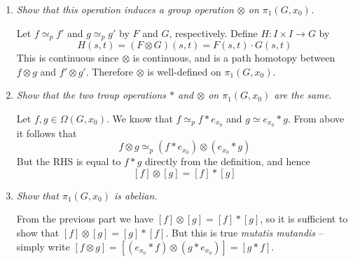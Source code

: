 \documentclass[10pt]{article}
\begin{document}
\begin{enumerate}
\begin{enumerate}
\item \emph{Show that this operation induces a group operation $\otimes$ on $\pi_1(G,x_0)$.}

Let $f \simeq_p f'$ and $g \simeq_p g'$ by $F$ and $G$, respectively.  Define $H: I \times I \rightarrow G$ by $$H(s,t) = (F \otimes G)(s,t) = F(s,t) \cdot G(s,t)$$  This is continuous since $\otimes$ is continuous, and is a path homotopy between $f \otimes g$ and $f' \otimes g'$.  Therefore $\otimes$ is well-defined on $\pi_1(G,x_0)$.

\item \emph{Show that the two troup operations $\ast$ and $\otimes$ on $\pi_1(G,x_0)$ are the same.}

Let $f,g \in \Omega(G,x_0)$.  We know that $f \simeq_p f \ast e_{x_0}$ and $g \simeq e_{x_0} \ast g$.  From above it follows that $$f \otimes g \simeq_p (f \ast e_{x_0}) \otimes (e_{x_0} \ast g)$$ But the RHS is equal to $f \ast g$ directly from the definition, and hence $$[f] \otimes [g] = [f] \ast [g]$$

\item \emph{Show that $\pi_1(G,x_0)$ is abelian.}

From the previous part we have $[f] \otimes [g] = [f] \ast [g]$, so it is sufficient to show that $[f] \otimes [g] = [g] \ast [f]$.  But this is true \emph{mutatis mutandis} -- simply write $[f \otimes g] = [(e_{x_0} \ast f) \otimes (g \ast e_{x_0})] = [g \ast f]$.
\end{enumerate}


\end{enumerate}
\end{document}
